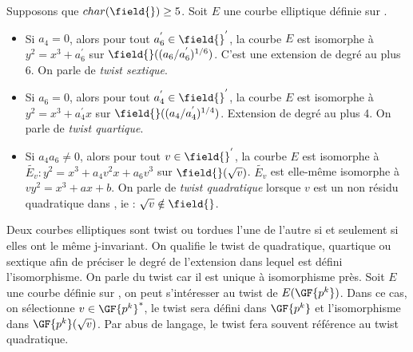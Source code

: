 \begin{propriete}
Supposons que $char(\field{}) \geq 5$. Soit $E$ une courbe elliptique définie sur \field{}.
\begin{itemize}[label=$\bullet$]
    \item Si $a_4 = 0$, alors pour tout $a_6^{'} \in \field{}^{'}$, la courbe $E$ est isomorphe à $y^2 = x^3 + a_6^{'}$ sur $\field{}((a_6/a_6^{'})^{1/6})$. C'est une extension de degré au plus 6. On parle de \emph{twist sextique}.
    \item Si $a_6 = 0$, alors pour tout $a_4^{'} \in \field{}^{'}$, la courbe $E$ est isomorphe à $y^2 = x^3 + a_4^{'}x$ sur $\field{}((a_4/a_4^{'})^{1/4})$. Extension de degré au plus 4. On parle de \emph{twist quartique}.
    \item Si $a_4a_6 \neq 0$, alors pour tout $v \in \field{}^{'}$, la courbe $E$ est isomorphe à $\tilde{E_v} : y^2 = x^3 + a_4v^2x + a_6v^3$ sur $\field{}(\sqrt{v})$. $\tilde{E_v}$ est elle-même isomorphe à $vy^2 = x^3 + ax + b$. On parle de \emph{twist quadratique} lorsque $v$ est un non résidu quadratique dans \field{}, ie : $\sqrt{v} \notin \field{}$.
\end{itemize}
Deux courbes elliptiques sont twist ou tordues l'une de l'autre si et seulement si elles ont le même j-invariant. On qualifie le twist de quadratique, quartique ou sextique afin de préciser le degré de l'extension dans lequel est défini l'isomorphisme. On parle du twist car il est unique à isomorphisme près.
Soit $E$ une courbe définie sur , on peut s'intéresser au twist de $E(\GF{p^k})$. Dans ce cas, on sélectionne $v \in \GF{p^k}^*$, le twist sera défini dans $\GF{p^k}$ et l'isomorphisme dans $\GF{p^k}(\sqrt{v})$. 
Par abus de langage, le twist fera souvent référence au twist quadratique.
\end{propriete}


